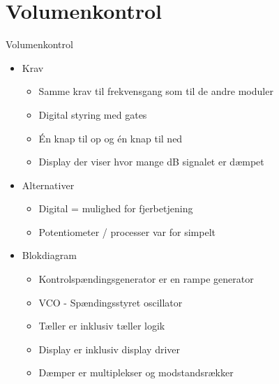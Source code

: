 \documentclass{beamer}
\begin{document}
\section{Volumenkontrol}
\begin{frame}{Volumenkontrol}
\begin{itemize}

\item Krav
\begin{itemize}
\item Samme krav til frekvensgang som til de andre moduler
\item Digital styring med gates
\item Én knap til op og én knap til ned
\item Display der viser hvor mange dB signalet er dæmpet
\end{itemize}

\item Alternativer
\begin{itemize}
\item Digital = mulighed for fjerbetjening
\item Potentiometer / processer var for simpelt
\end{itemize}

\item Blokdiagram
\begin{itemize}
\item Kontrolspændingsgenerator er en rampe generator
\item VCO - Spændingsstyret oscillator
\item Tæller er inklusiv tæller logik
\item Display er inklusiv display driver
\item Dæmper er multiplekser og modstandsrækker
\end{itemize}
\end{itemize}
\end{frame}
\end{document}
